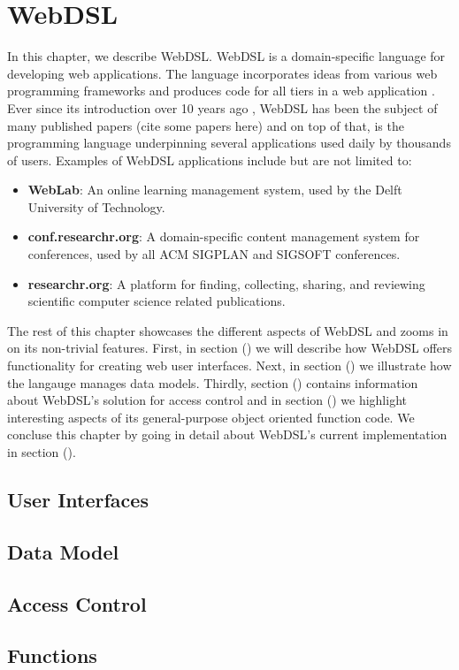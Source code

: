 
\chapter{\label{chap:webdsl}WebDSL}

  In this chapter, we describe WebDSL. WebDSL is a domain-specific language for developing web applications. The language incorporates ideas from various web programming frameworks and produces code for all tiers in a web application \autocite{Groenewegen2020}. Ever since its introduction over 10 years ago \autocite{Visser07}, WebDSL has been the subject of many published papers (cite some papers here) and on top of that, is the programming language underpinning several applications used daily by thousands of users. Examples of WebDSL applications include but are not limited to:
  \begin{itemize}
    \item \textbf{WebLab}: An online learning management system, used by the Delft University of Technology.
    \item \textbf{conf.researchr.org}: A domain-specific content management system for conferences, used by all ACM SIGPLAN and SIGSOFT conferences.
    \item \textbf{researchr.org}: A platform for finding, collecting, sharing, and reviewing scientific computer science related publications.
  \end{itemize}

  The rest of this chapter showcases the different aspects of WebDSL and zooms in on its non-trivial features. First, in section () we will describe how WebDSL offers functionality for creating web user interfaces. Next, in section () we illustrate how the langauge manages data models. Thirdly, section () contains information about WebDSL's solution for access control and in section () we highlight interesting aspects of its general-purpose object oriented function code. We concluse this chapter by going in detail about WebDSL's current implementation in section ().

  \section{User Interfaces}

  \section{Data Model}

  \section{Access Control}

  \section{Functions}

